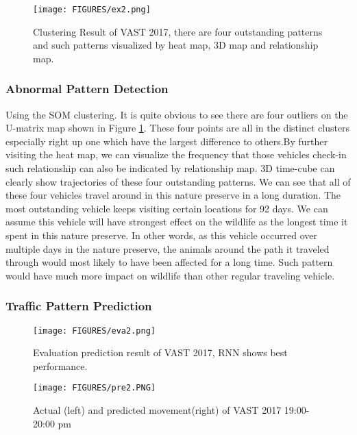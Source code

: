 \documentclass[runningheads,a4paper]{llncs}
\begin{document}
\begin{figure}[!h]
\centering
\texttt{[image: FIGURES/ex2.png]}
\caption{\label{fig:ex2} Clustering Result of VAST 2017, there are four outstanding patterns and such patterns visualized by heat map, 3D map and relationship map.}
\end{figure}

\subsubsection{Abnormal Pattern Detection}

Using the SOM clustering. It is quite obvious to see there are four outliers on the U-matrix map shown in Figure \ref{fig:ex2}. These four points are all in the distinct clusters especially right up one which have the largest difference to others.By further visiting the heat map, we can visualize the frequency that those vehicles check-in such relationship can also be indicated by relationship map. 3D time-cube can clearly show trajectories of these four outstanding patterns. We can see that all of these four vehicles travel around in this nature preserve in a long duration. The most outstanding vehicle keeps visiting certain locations for 92 days. We can assume this vehicle will have strongest effect on the wildlife as the longest time it spent in this nature preserve. In other words, as this vehicle occurred over multiple days in the nature preserve, the animals around the path it traveled through would most likely to have been affected for a long time. Such pattern would have much more impact on wildlife than other regular traveling vehicle.


\subsubsection{Traffic Pattern Prediction}
\begin{figure}[!h]
\centering
\texttt{[image: FIGURES/eva2.png]}
\caption{\label{fig:eva2} Evaluation prediction result of VAST 2017, RNN shows best performance.}
\end{figure}

\begin{figure}[!h]
\centering
\texttt{[image: FIGURES/pre2.PNG]}
\caption{\label{fig:pre2} Actual (left) and predicted movement(right) of VAST 2017 19:00- 20:00 pm}
\end{figure}
\end{document}
